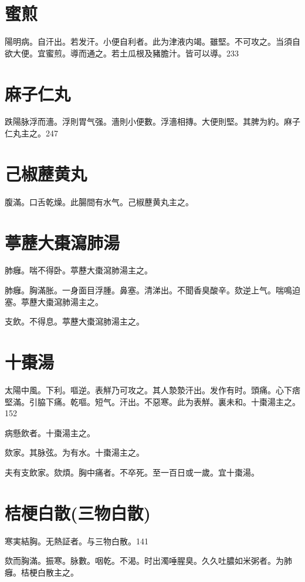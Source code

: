\documentclass[12pt,twoside,UTF8,b5paper]{ctexbook}
\begin{document}
\section{蜜煎}

陽明病。自汗出。若发汗。小便自利者。此为{津液}内竭。雖堅。不可攻之。当須自欲大便。宜蜜煎。導而通之。若土瓜根及豬膽汁。皆可以導。233

\section{麻子仁丸}

跌陽脉浮而濇。浮則胃气强。濇則小便數。浮濇相摶。大便則堅。其脾为約。麻子仁丸主之。247

\section{己椒藶黄丸}

腹滿。口舌乾燥。此腸間有水气。己椒藶黄丸主之。

\section{葶藶大棗瀉肺湯}

肺癰。喘不得卧。葶藶大棗瀉肺湯主之。

肺癰。胸滿胀。一身面目浮腫。鼻塞。清涕出。不聞香臭酸辛。欬逆上气。喘鳴迫塞。葶藶大棗瀉肺湯主之。

支飲。不得息。葶藶大棗瀉肺湯主之。

\section{十棗湯}

太陽中風。下利。嘔逆。表觧乃可攻之。其人漐漐汗出。发作有时。頭痛。心下痞堅滿。引脇下痛。乾嘔。短气。汗出。不惡寒。此为表觧。裏未和。十棗湯主之。152

病懸飲者。十棗湯主之。

欬家。其脉弦。为有水。十棗湯主之。

夫有支飲家。欬煩。胸中痛者。不卒死。至一百日{或}一歲。宜十棗湯。

\section{桔梗白散(三物白散)}

寒実結胸。无熱証者。与三物白散。141

欬而胸滿。振寒。脉數。咽乾。不渴。时出濁唾腥臭。久久吐膿如米粥者。为肺癰。桔梗白散主之。
\end{document}

